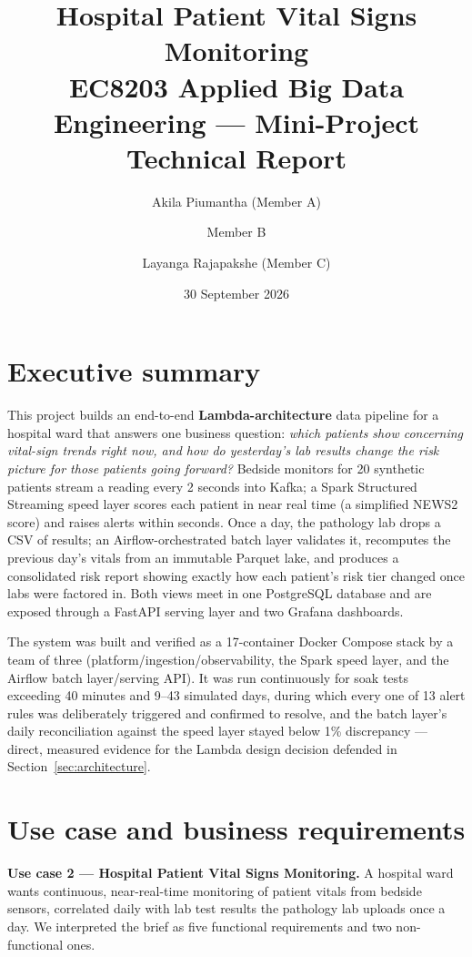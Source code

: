 \documentclass[11pt,a4paper]{article}
\title{\textbf{Hospital Patient Vital Signs Monitoring}\\[0.3em]
\large EC8203 Applied Big Data Engineering --- Mini-Project Technical Report}
\author{Akila Piumantha (Member A) \and Member B \and Layanga Rajapakshe (Member C)}
\date{30 September 2026}
\begin{document}
\maketitle
\thispagestyle{empty}
\newpage

\tableofcontents
\newpage

\section*{Executive summary}

This project builds an end-to-end \textbf{Lambda-architecture} data pipeline for a hospital ward
that answers one business question: \emph{which patients show concerning vital-sign trends right
now, and how do yesterday's lab results change the risk picture for those patients going forward?}
Bedside monitors for 20 synthetic patients stream a reading every 2 seconds into Kafka; a Spark
Structured Streaming speed layer scores each patient in near real time (a simplified NEWS2 score)
and raises alerts within seconds. Once a day, the pathology lab drops a CSV of results; an
Airflow-orchestrated batch layer validates it, recomputes the previous day's vitals from an
immutable Parquet lake, and produces a consolidated risk report showing exactly how each patient's
risk tier changed once labs were factored in. Both views meet in one PostgreSQL database and are
exposed through a FastAPI serving layer and two Grafana dashboards.

The system was built and verified as a 17-container Docker Compose stack by a team of three
(platform/ingestion/observability, the Spark speed layer, and the Airflow batch layer/serving API).
It was run continuously for soak tests exceeding 40 minutes and 9--43 simulated days, during which
every one of 13 alert rules was deliberately triggered and confirmed to resolve, and the batch
layer's daily reconciliation against the speed layer stayed below 1\% discrepancy --- direct,
measured evidence for the Lambda design decision defended in Section~\ref{sec:architecture}.

\section{Use case and business requirements}

\textbf{Use case 2 --- Hospital Patient Vital Signs Monitoring.} A hospital ward wants continuous,
near-real-time monitoring of patient vitals from bedside sensors, correlated daily with lab test
results the pathology lab uploads once a day. We interpreted the brief as five functional
requirements and two non-functional ones.
\end{document}
